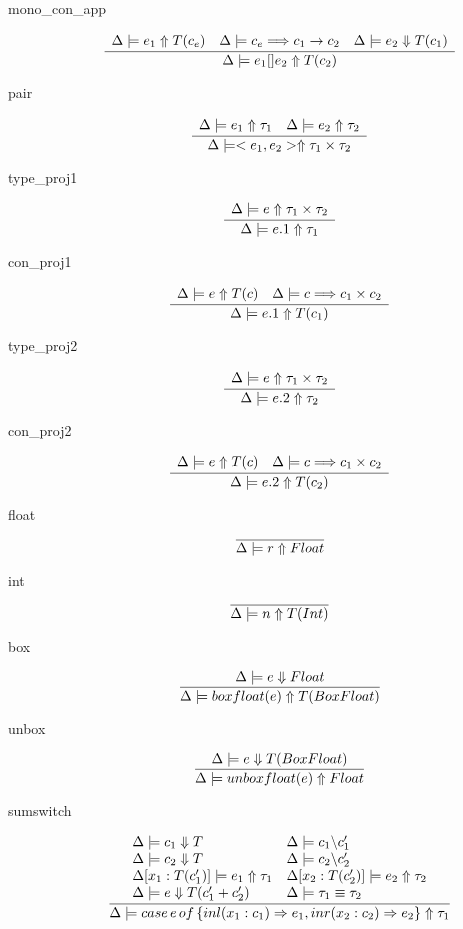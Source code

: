 \documentclass[12pt,twoside,fleqn]{amsart}
\theoremstyle{plain}
\theoremstyle{plain}
\theoremstyle{definition}
\begin{document}
\begin{description}
\item [mono\_con\_app]
\[
\frac{\begin{array}{lll}
\Delta  \models e_{1}  \Uparrow T(c_{e})  & \Delta  \models c_{e} \Longrightarrow c_{1}\rightarrow c_{2} & \Delta  \models e_{2} \Downarrow T(c_{1})
\end{array} }{\Delta  \models e_{1}[]e_{2}  \Uparrow T(c_{2})  }\]

\item [pair]
\[
\frac{\begin{array}{ll}
\Delta  \models e_{1}  \Uparrow \tau _{1}  & \Delta  \models e_{2}  \Uparrow \tau _{2} 
\end{array} }{\Delta  \models <e_{1},e_{2}>  \Uparrow \tau _{1}\times \tau _{2}  }\]

\item [type\_proj1]
\[
\frac{\begin{array}{ll}
\Delta  \models e  \Uparrow \tau _{1}\times \tau _{2} 
\end{array} }{\Delta  \models e.1  \Uparrow \tau _{1}  }\]

\item [con\_proj1]
\[
\frac{\begin{array}{ll}
\Delta  \models e  \Uparrow T(c)  & \Delta  \models c \Longrightarrow c_{1}\times c_{2}
\end{array} }{\Delta  \models e.1  \Uparrow T(c_{1})  }\]

\item [type\_proj2]
\[
\frac{\begin{array}{ll}
\Delta  \models e  \Uparrow \tau _{1}\times \tau _{2} 
\end{array} }{\Delta  \models e.2  \Uparrow \tau _{2}  }\]

\item [con\_proj2]
\[
\frac{\begin{array}{ll}
\Delta  \models e  \Uparrow T(c)  & \Delta  \models c \Longrightarrow c_{1}\times c_{2}
\end{array} }{\Delta  \models e.2  \Uparrow T(c_{2})  }\]

\item [float]
\[
\overline{\Delta  \models r  \Uparrow Float  }\]

\item [int]
\[
\overline{\Delta  \models n  \Uparrow T(Int)  }\]

\item [box]
\[
\frac{\Delta  \models e \Downarrow Float }{\Delta  \models boxfloat(e )  \Uparrow T(BoxFloat)  }\]

\item [unbox]
\[
\frac{\Delta  \models e \Downarrow T(BoxFloat) }{\Delta  \models unboxfloat(e )  \Uparrow Float  }\]

\item [sumswitch]
\[
\frac{\begin{array}{ll}
\Delta  \models c_{1} \Downarrow T & \Delta  \models c_{1} \backslash c_{1}'\\
\Delta  \models c_{2} \Downarrow T & \Delta  \models c_{2} \backslash c_{2}'\\
\Delta  [x_{1}  :T(c_{1}')  ] \models e_{1} \Uparrow \tau _{1} & \Delta  [x_{2}  :T(c_{2}')  ] \models e_{2} \Uparrow \tau _{2}\\
\Delta  \models e \Downarrow T(c_{1}'+c_{2}') & \Delta  \models \tau _{1}  \equiv \tau _{2} 
\end{array} }{\Delta  \models case\, e \, of\, \{inl(x_{1} :c_{1} )\Rightarrow e_{1} ,inr(x_{2} :c_{2} )\Rightarrow e_{2} \}  \Uparrow \tau _{1}  }\]


\end{description}
\end{document}
